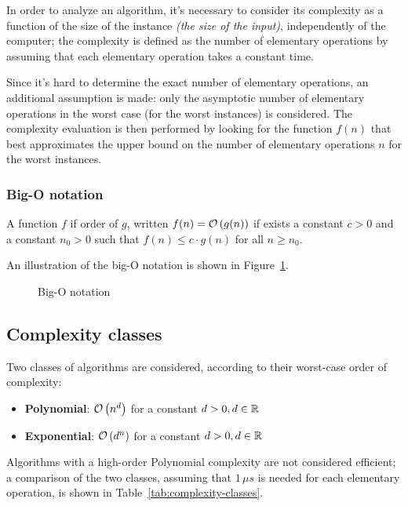 \documentclass[english]{article}
\begin{document}
In order to analyze an algorithm, it's necessary to consider its complexity as a function of the size of the instance \textit{(the size of the input)}, independently of the computer;
the complexity is defined as the number of elementary operations by assuming that each elementary operation takes a constant time.

Since it's hard to determine the exact number of elementary operations, an additional assumption is made: only the asymptotic number of elementary operations in the worst case (for the worst instances) is considered.
The complexity evaluation is then performed by looking for the function \(f(n)\) that best approximates the upper bound on the number of elementary operations \(n\) for the worst instances.

\subsubsection{Big-O notation}

A function \(f\) if order of \(g\), written \(f(n) = \mathcal{O}\left(g(n)\right)\) if exists a constant \(c > 0\) and a constant \(n_0 > 0\) such that \(f(n) \leq c \cdot g(n)\) for all \(n \geq n_0\).

An illustration of the big-O notation is shown in Figure~\ref{fig:big-o-notation}.

\begin{figure}[htbp]
  \bigskip
  \centering
  \caption{Big-O notation}
  \label{fig:big-o-notation}
  \bigskip
\end{figure}

\subsection{Complexity classes}

Two classes of algorithms are considered, according to their worst-case order of complexity:

\begin{itemize}
  \item \textbf{Polynomial}: \(\mathcal{O}\left(n^d\right)\) for a constant \(d > 0, d \in \mathbb{R}\)
  \item \textbf{Exponential}: \(\mathcal{O}\left(d^n\right)\) for a constant \(d > 0, d \in \mathbb{R}\)
\end{itemize}

Algorithms with a high-order Polynomial complexity are not considered efficient;
a comparison of the two classes, assuming that \(1 \, \mu s\) is needed for each elementary operation, is shown in Table~\ref{tab:complexity-classes}.
\end{document}
